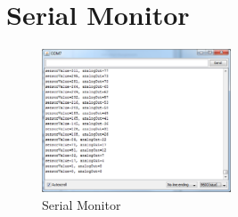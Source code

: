 
\section{Serial Monitor}

\begin{figure}[ht]
\centerline{\includegraphics[width=0.5\textwidth]{figures/SM.png}}
\caption{Serial Monitor}
\label{SM}
\end{figure}

